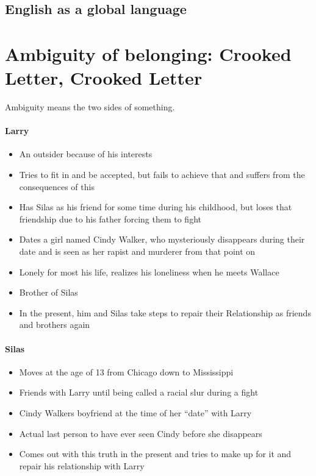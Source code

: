 \documentclass[10pt]{article}
\begin{document}
\subsection{English as a global language}
	\label{ssec:media@english}
\newpage
\section{Ambiguity of belonging: Crooked Letter, Crooked Letter}
	\label{sec:crookedl}
\begin{definition}
Ambiguity means the two sides of something.
\end{definition}

\paragraph{Larry}
\begin{itemize}
\item An outsider because of his interests
\item Tries to fit in and be accepted, but fails to achieve that and suffers from the consequences of this
\item Has Silas as his friend for some time during his childhood, but loses that friendship due to his father forcing them to fight
\item Dates a girl named Cindy Walker, who mysteriously disappears during their date and is seen as her rapist and murderer from that point on
\item Lonely for most his life, realizes his loneliness when he meets Wallace
\item Brother of Silas
\item In the present, him and Silas take steps to repair their Relationship as friends and brothers again
\end{itemize}

\paragraph{Silas}
\begin{itemize}
\item Moves at the age of 13 from Chicago down to Mississippi
\item Friends with Larry until being called a racial slur during a fight
\item Cindy Walkers boyfriend at the time of her \enquote{date} with Larry
\item Actual last person to have ever seen Cindy before she disappears
\item Comes out with this truth in the present and tries to make up for it and repair his relationship with Larry
\end{itemize}
\end{document}
